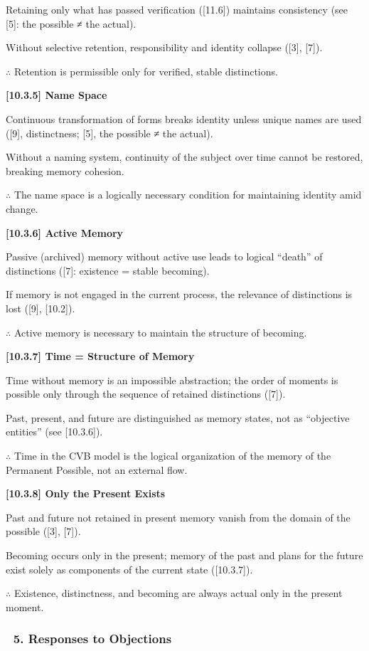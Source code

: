 \documentclass[12pt]{article}
\begin{document}
Retaining only what has passed verification ([11.6]) maintains consistency (see [5]: the possible ≠ the actual).

Without selective retention, responsibility and identity collapse ([3], [7]).

$\therefore$ Retention is permissible only for verified, stable distinctions.

\bigskip
\textbf{[10.3.5] Name Space}

Continuous transformation of forms breaks identity unless unique names are used ([9], distinctness; [5], the possible ≠ the actual).

Without a naming system, continuity of the subject over time cannot be restored, breaking memory cohesion.

$\therefore$ The name space is a logically necessary condition for maintaining identity amid change.

\bigskip
\textbf{[10.3.6] Active Memory}

Passive (archived) memory without active use leads to logical ``death'' of distinctions ([7]: existence = stable becoming).

If memory is not engaged in the current process, the relevance of distinctions is lost ([9], [10.2]).

$\therefore$ Active memory is necessary to maintain the structure of becoming.

\bigskip
\textbf{[10.3.7] Time = Structure of Memory}

Time without memory is an impossible abstraction; the order of moments is possible only through the sequence of retained distinctions ([7]).

Past, present, and future are distinguished as memory states, not as ``objective entities'' (see [10.3.6]).

$\therefore$ Time in the CVB model is the logical organization of the memory of the Permanent Possible, not an external flow.

\bigskip
\textbf{[10.3.8] Only the Present Exists}

Past and future not retained in present memory vanish from the domain of the possible ([3], [7]).

Becoming occurs only in the present; memory of the past and plans for the future exist solely as components of the current state ([10.3.7]).

$\therefore$ Existence, distinctness, and becoming are always actual only in the present moment.


\subsubsection*{🔹 5. Responses to Objections}
\end{document}
